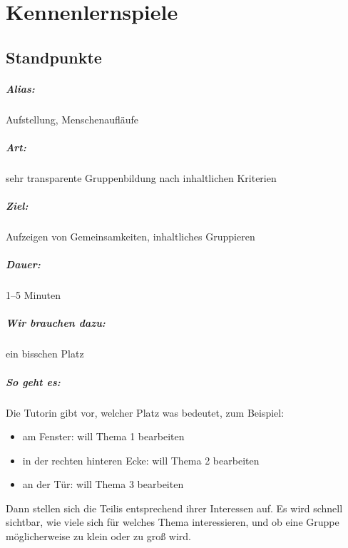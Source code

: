 \chapter{Kennenlernspiele}

\section{Standpunkte}
\label{standpunkte}

\paragraph{Alias:} Aufstellung, Menschenaufläufe
\paragraph{Art:} sehr transparente Gruppenbildung nach inhaltlichen Kriterien
\paragraph{Ziel:} Aufzeigen von Gemeinsamkeiten, inhaltliches Gruppieren
\paragraph{Dauer:} 1--5 Minuten
\paragraph{Wir brauchen dazu:} ein bisschen Platz
\paragraph{So geht es:} Die Tutorin gibt vor, welcher Platz was bedeutet, zum Beispiel:
  \begin{itemize}
    \item am Fenster: will Thema 1 bearbeiten
    \item in der rechten hinteren Ecke: will Thema 2 bearbeiten
    \item an der Tür: will Thema 3 bearbeiten
  \end{itemize}
  Dann stellen sich die Teilis entsprechend ihrer Interessen auf. Es wird schnell sichtbar, wie viele sich für welches Thema interessieren, und ob eine Gruppe möglicherweise zu klein oder zu groß wird.
